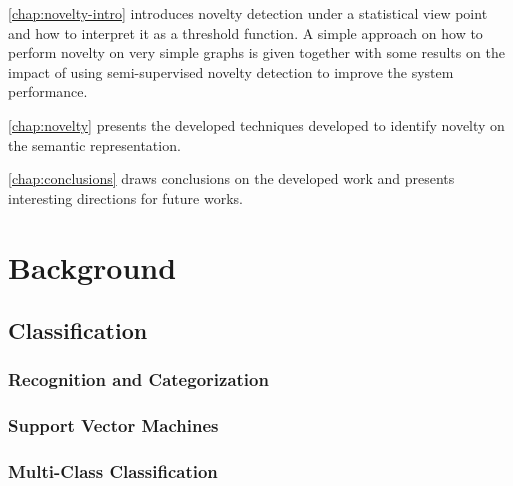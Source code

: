 \autoref{chap:novelty-intro} introduces novelty detection under a
statistical view point and how to interpret it as a threshold function.
A simple approach on how to perform novelty on very simple graphs
is given together with some results on the impact of using semi-supervised
novelty detection to improve the system performance.

\autoref{chap:novelty} presents the developed techniques developed to identify
novelty on the semantic representation.

\autoref{chap:conclusions} draws conclusions on the developed work and presents
interesting directions for future works.



\chapter{Background}\label{chap:background}
%
%
%

\section{Classification}
\subsection{Recognition and Categorization}
\subsection{Support Vector Machines}
\subsection{Multi-Class Classification}


